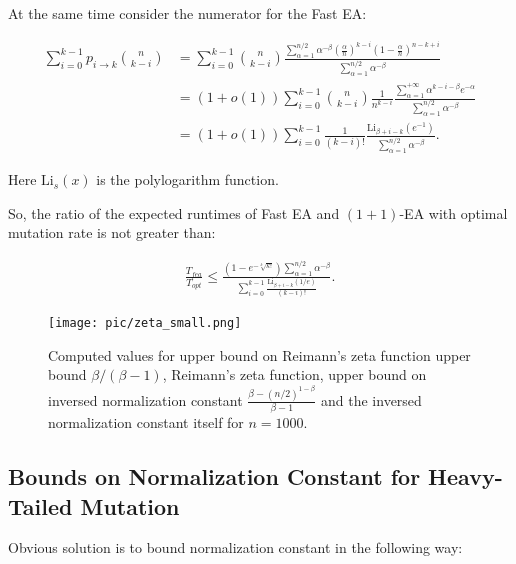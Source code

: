 \documentclass{article}
\begin{document}
At the same time consider the numerator for the Fast EA:

\begin{align*}
  \sum\limits_{i = 0}^{k - 1}p_{i \to k} \binom{n}{k - i} &= \sum\limits_{i = 0}^{k - 1} \binom{n}{k - i} \frac{\sum\limits_{\alpha = 1}^{n / 2} \alpha^{-\beta} \left(\frac{\alpha}{n}\right)^{k - i} \left(1 - \frac{\alpha}{n}\right)^{n - k + i}}{\sum\limits_{\alpha = 1}^{n / 2} \alpha^{-\beta}} \\
  &= (1 + o(1)) \sum\limits_{i = 0}^{k - 1} \binom{n}{k - i} \frac{1}{n^{k - i}} \frac{\sum\limits_{\alpha = 1}^{+\infty} \alpha^{k - i - \beta} e^{-\alpha}}{\sum\limits_{\alpha = 1}^{n/2} \alpha^{-\beta}} \\
  &= (1 + o(1)) \sum\limits_{i = 0}^{k - 1}\frac{1}{(k - i)!}\frac{\text{Li}_{\beta + i - k}(e^{-1})}{\sum\limits_{\alpha = 1}^{n/2} \alpha^{-\beta}}.
\end{align*}




Here $\text{Li}_s(x)$ is the polylogarithm function.

So, the ratio of the expected runtimes of Fast EA and $(1 + 1)$-EA with optimal mutation rate is not greater than:

\begin{align*}
  \frac{T_{fea}}{T_{opt}} \le \frac{(1 - e^{-\sqrt[k]{k!}})\sum\limits_{\alpha = 1}^{n/2} \alpha^{-\beta}}{\sum\limits_{i = 0}^{k - 1}\frac{\text{Li}_{\beta + i - k}(1/e)}{(k - i)!}}.
\end{align*}

\begin{figure}
  \begin{center}
  \texttt{[image: pic/zeta\_small.png]}
  \end{center}
  \caption{Computed values for upper bound on Reimann's zeta function upper bound $\beta/(\beta - 1)$, Reimann's zeta function, upper bound on inversed normalization constant $\frac{\beta - (n/2)^{1 -\beta}}{\beta - 1}$ and the inversed normalization constant itself  for $n = 1000.$
  \label{zeta}}
\end{figure}

\subsection{Bounds on Normalization Constant for Heavy-Tailed Mutation}

Obvious solution is to bound normalization constant in the following way:
\end{document}
